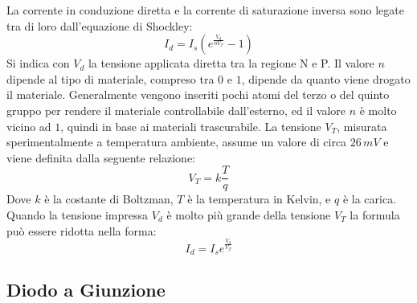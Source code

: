 \documentclass{article}
\numberwithin{equation}{subsection}
\begin{document}
La corrente in conduzione diretta e la corrente di saturazione inversa sono legate tra di loro dall'equazione di Shockley:
\begin{equation}
    I_d=\displaystyle I_s\left(e^{\frac{V_d}{nV_T}}-1\right)
\end{equation}
Si indica con $V_d$ la tensione applicata diretta tra la regione N e P. Il valore $n$ dipende al tipo di materiale, compreso tra $0$ e $1$, dipende da quanto viene 
drogato il materiale. Generalmente vengono 
inseriti pochi atomi del terzo o del quinto gruppo per rendere il materiale controllabile dall'esterno, ed il valore $n$ è molto vicino ad $1$, quindi in base ai materiali 
trascurabile. 
La tensione $V_T$, misurata sperimentalmente a temperatura ambiente, assume un valore di circa $26\,mV$ e viene definita dalla seguente relazione:
\begin{equation}
    V_T=\displaystyle k\frac{T}{q}
\end{equation}
Dove $k$ è la costante di Boltzman, $T$ è la temperatura in Kelvin, e $q$ è la carica.
Quando la tensione impressa $V_d$ è molto più grande della tensione $V_T$ la formula può essere ridotta nella forma:
\begin{equation}
    I_d=I_se^{\frac{V_d}{V_T}}
\end{equation} 

\subsection{Diodo a Giunzione}
\end{document}
